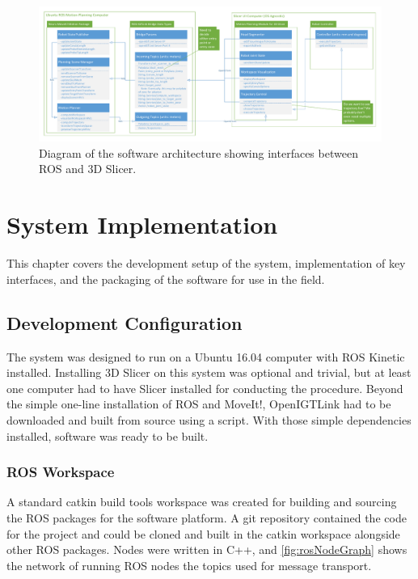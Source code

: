\documentclass[12pt]{report}
\makeatletter
\renewcommand{\todo}[2][]{%
    \@todo[caption={#2}, #1]{\begin{spacing}{0.5}#2\end{spacing}}%
}
\makeatother
\begin{document}
\begin{figure}[thpb]
	\centering
	\includegraphics[width=\textwidth]{diagrams/Software_Diagrams.pdf}
    \todo[inline]{update}
    \caption{Diagram of the software architecture showing interfaces between ROS and 3D Slicer. }
    \label{fig:softwareDiagram}
\end{figure}


\chapter{System Implementation}
This chapter covers the development setup of the system, implementation of key interfaces, and the packaging of the software for use in the field.


\section{Development Configuration}
The system was designed to run on a Ubuntu 16.04 computer with ROS Kinetic installed. Installing 3D Slicer on this system was optional and trivial, but at least one computer had to have Slicer installed for conducting the procedure. Beyond the simple one-line installation of ROS and MoveIt!, OpenIGTLink had to be downloaded and built from source using a script. With those simple dependencies installed, software was ready to be built.

\subsection{ROS Workspace}
A standard catkin build tools workspace was created for building and sourcing the ROS packages for the software platform. A git repository contained the code for the project and could be cloned and built in the catkin workspace alongside other ROS packages. Nodes were written in C++, and \autoref{fig:rosNodeGraph} shows the network of running ROS nodes the topics used for message transport.
\end{document}
